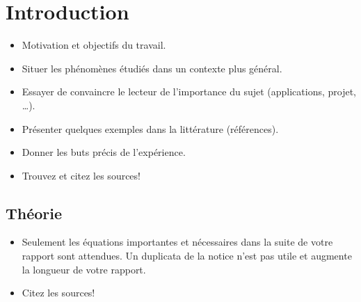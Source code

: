 \section{Introduction}

\begin{itemize}
\item Motivation et objectifs du travail.
\item Situer les phénomènes étudiés dans un contexte plus général. 
\item Essayer de convaincre le lecteur de l'importance du sujet (applications, projet, \dots).
\item Présenter quelques exemples dans la littérature (références).
\item Donner les buts précis de l'expérience.
\item Trouvez et citez les sources!
\end{itemize}

\subsection{Théorie}

\begin{itemize}
    \item Seulement les équations importantes et nécessaires dans la suite de votre rapport sont attendues. Un duplicata de la notice n'est pas utile et augmente la longueur de votre rapport.
    \item Citez les sources!
\end{itemize}